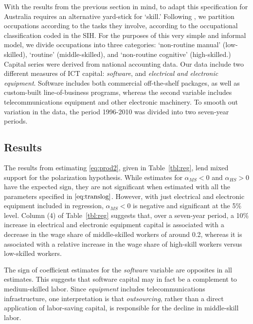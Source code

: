 \documentclass[a4paper,11pt,notitlepage]{article}
\begin{document}
With the results from the previous section in mind, to adapt this specification for Australia requires an alternative yard-stick for `skill.' Following \citet{Levy2003}, we partition occupations according to the tasks they involve, according to the occupational classification coded in the SIH. For the purposes of this very simple and informal model, we divide occupations into three categories: `non-routine manual' (low-skilled), `routine' (middle-skilled), and `non-routine cognitive' (high-skilled.) Capital series were derived from national accounting data. Our data include two different measures of ICT capital: {\em software}, and {\em electrical and electronic equipment}. Software includes both commercial off-the-shelf packages, as well as custom-built line-of-business programs, whereas the second variable includes telecommunications equipment and other electronic machinery. To smooth out variation in the data, the  period 1996-2010 was divided into two seven-year periods.

\subsection{Results}

The results from estimating \eqref{eq:prod2}, given in Table~\ref{tbl:reg}, lend mixed support for the polarization hypothesis. While estimates for $\alpha_{MS}<0$ and $\alpha_{HS}>0$ have the expected sign, they are not significant when estimated with all the parameters specified in $\eqref{eq:translog}$. However, with just electrical and electronic equipment included in regression, $\alpha_{MS}<0$ is negative and significant at the 5\% level. Column (4) of Table~\ref{tbl:reg} suggests that, over a seven-year period, a 10\% increase in electrical and electronic equipment capital is associated with a decrease in the wage share of middle-skilled workers of around 0.2, whereas it is associated with a relative increase in the wage share of high-skill workers versus low-skilled workers.

The sign of coefficient estimates for the {\em software} variable are opposites in all estimates. This suggests that software capital may in fact be a complement to medium-skilled labor. Since {\em equipment} includes telecommunications infrastructure, one interpretation is that {\em outsourcing}, rather than a direct application of labor-saving capital, is responsible for the decline in middle-skill labor.
\end{document}
